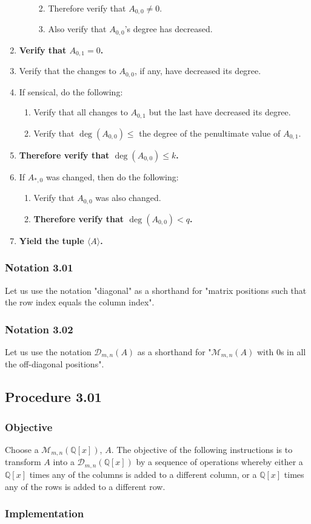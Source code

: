 \documentclass[twocolumn]{article}
\newcommand{\notation}[1]{\subsubsection*{Notation #1}}
\newcommand{\procedure}[2][]{\subsection*{Procedure #2 \ifthenelse{\equal{#1}{}}{}{(#1)}}\label{sec:procedure #2}}
\newcommand{\objective}{\subsubsection*{Objective}}
\newcommand{\implementation}{\subsubsection*{Implementation}}
\begin{document}
\begin{enumerate}
\begin{enumerate}
\begin{enumerate}
\begin{enumerate}
							\end{enumerate}
							\item Therefore verify that $A_{0,0}\ne 0$.
							\item Also verify that $A_{0,0}$'s degree has decreased.
						\end{enumerate}
					\end{enumerate}
					\item \textbf{Verify that $A_{0,1}=0$.}
					\item Verify that the changes to $A_{0,0}$, if any, have decreased its degree.
					\item If sensical, do the following:
					\begin{enumerate}
						\item Verify that all changes to $A_{0,1}$ but the last have decreased its degree.
						\item Verify that $\deg(A_{0,0})\le$ the degree of the penultimate value of $A_{0,1}$.
					\end{enumerate}
					\item \textbf{Therefore verify that $\deg(A_{0,0})\le k$.}
					\item If $A_{*,0}$ was changed, then do the following:
					\begin{enumerate}
						\item Verify that $A_{0,0}$ was also changed.
						\item \textbf{Therefore verify that $\deg(A_{0,0})<q$.}
					\end{enumerate}
					\item \textbf{Yield the tuple $\langle A\rangle$.}
				\end{enumerate}
		\notation{3.01}
			Let us use the notation "diagonal" as a shorthand for "matrix positions such that the row index equals the column index".
		\notation{3.02}
			Let us use the notation $\mathcal{D}_{m,n}(A)$ as a shorthand for "$\mathcal{M}_{m,n}(A)$ with $0$s in all the off-diagonal positions".
		\procedure{3.01}
			\objective
				Choose a $\mathcal{M}_{m,n}(\mathbb{Q}[x])$, $A$. The objective of the following instructions is to transform $A$ into a $\mathcal{D}_{m,n}(\mathbb{Q}[x])$ by a sequence of operations whereby either a $\mathbb{Q}[x]$ times any of the columns is added to a different column, or a $\mathbb{Q}[x]$ times any of the rows is added to a different row.
			\implementation
\end{document}
